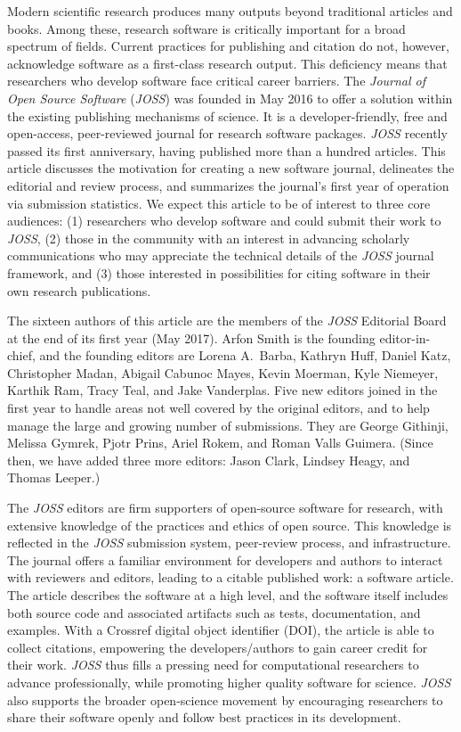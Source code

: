 \documentclass{article}
\newcommand\joss{\textit{JOSS}}
\begin{document}
Modern scientific research produces many outputs beyond traditional articles and books. Among these, research software is critically important for a broad spectrum of fields.
Current practices for publishing and citation do not, however, acknowledge software as a first-class research output. This deficiency means that researchers who develop software face critical career barriers.
The \textit{Journal of Open Source Software} (\joss{}) was founded in May 2016 to offer a solution within the existing publishing mechanisms of science.
It is a developer-friendly, free and open-access, peer-reviewed journal for research software packages.
\joss{} recently passed its first anniversary, having published more than a hundred articles.
This article discusses the motivation for creating a new software journal, delineates the editorial and review process, and summarizes the journal's first year of operation via submission statistics.
We expect this article to be of interest to three core audiences: (1) researchers who develop software and could submit their work to \joss{},
(2) those in the community with an interest in advancing scholarly communications who may appreciate the technical details of the \joss{} journal framework, and
(3) those interested in possibilities for citing software in their own research publications.

The sixteen authors of this article are the members of the \joss{} Editorial Board at the end of its first year (May 2017). Arfon Smith is the founding editor-in-chief, and the founding editors are Lorena A.~Barba, Kathryn Huff, Daniel Katz, Christopher Madan, Abigail Cabunoc Mayes, Kevin Moerman, Kyle Niemeyer, Karthik Ram, Tracy Teal, and Jake Vanderplas.
Five new editors joined in the first year to handle areas not well covered by the original editors, and to help manage the large and growing number of submissions. They are George Githinji, Melissa Gymrek, Pjotr Prins, Ariel Rokem, and Roman Valls Guimera.
(Since then, we have added three more editors: Jason Clark, Lindsey Heagy, and Thomas Leeper.)

The \joss{} editors are firm supporters of open-source software for research, with extensive knowledge of the practices and ethics of open source. This knowledge is reflected in the \joss{} submission system, peer-review process, and infrastructure. The journal offers a familiar environment for developers and authors to interact with reviewers and editors, leading to a citable published work: a software article.
The article describes the software at a high level, and the software itself includes both source code and associated artifacts such as tests, documentation, and examples.
With a Crossref digital object identifier (DOI), the article is able to collect citations, empowering the developers/authors to gain career credit for their work.
\joss{} thus fills a pressing need for computational researchers to advance professionally, while promoting higher quality software for science.
\joss{} also supports the broader open-science movement by encouraging researchers to share their software openly and follow best practices in its development.
\end{document}
